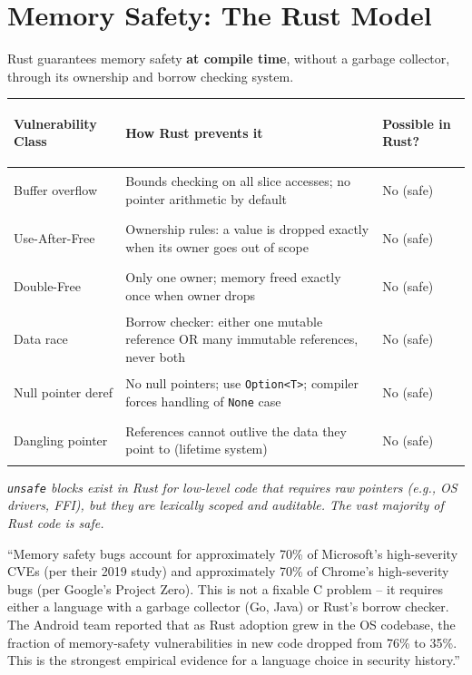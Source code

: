 \documentclass[11pt, letterpaper]{article}
\newcommand{\talkingpoint}[1]{%
  \begin{tcolorbox}[colback=talkbg, colframe=talkborder,
    title={\bfseries Interview Talking Point}, arc=3pt, boxrule=1pt]
  #1
  \end{tcolorbox}%
}
\begin{document}
\section*{Memory Safety: The Rust Model}

Rust guarantees memory safety \textbf{at compile time}, without a garbage collector, through its ownership and borrow checking system.

\noindent
{\renewcommand{\arraystretch}{1.6}
\begin{tabularx}{\textwidth}{>{\bfseries\raggedright\arraybackslash}p{4cm}
                              >{\raggedright\arraybackslash}X
                              >{\centering\arraybackslash}p{2.2cm}}
\toprule
\rowcolor{tableheadergrey}
\textbf{Vulnerability Class} & \textbf{How Rust prevents it} & \textbf{Possible in Rust?} \\
\midrule
\rowcolor{rowGr} Buffer overflow    & Bounds checking on all slice accesses; no pointer arithmetic by default & No (safe) \\
\rowcolor{rowA}  Use-After-Free     & Ownership rules: a value is dropped exactly when its owner goes out of scope & No (safe) \\
\rowcolor{rowGr} Double-Free        & Only one owner; memory freed exactly once when owner drops & No (safe) \\
\rowcolor{rowA}  Data race          & Borrow checker: either one mutable reference OR many immutable references, never both & No (safe) \\
\rowcolor{rowGr} Null pointer deref & No null pointers; use \texttt{Option<T>}; compiler forces handling of \texttt{None} case & No (safe) \\
\rowcolor{rowA}  Dangling pointer   & References cannot outlive the data they point to (lifetime system) & No (safe) \\
\bottomrule
\end{tabularx}}

\vspace{4pt}
\textit{\texttt{unsafe} blocks exist in Rust for low-level code that requires raw pointers (e.g., OS drivers, FFI), but they are lexically scoped and auditable. The vast majority of Rust code is safe.}

\talkingpoint{``Memory safety bugs account for approximately 70\% of Microsoft's high-severity CVEs (per their 2019 study) and approximately 70\% of Chrome's high-severity bugs (per Google's Project Zero). This is not a fixable C problem -- it requires either a language with a garbage collector (Go, Java) or Rust's borrow checker. The Android team reported that as Rust adoption grew in the OS codebase, the fraction of memory-safety vulnerabilities in new code dropped from 76\% to 35\%. This is the strongest empirical evidence for a language choice in security history.''}
\end{document}

